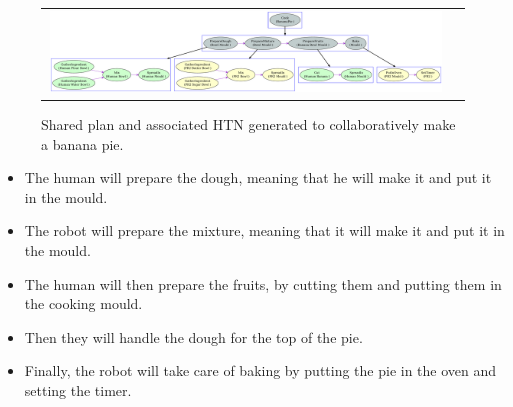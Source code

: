 \begin{figure}[ht!]
 \centering
 \begin{tabular}{cc}
  \includegraphics[width=0.99\textwidth]{img/plan_management/bananaPie.pdf}
 \end{tabular}
   \vspace{-8pt}
 \caption{Shared plan and associated HTN generated to collaboratively make a banana pie.}
 \label{fig:plan_management-bananaPlan}
   \vspace{-22pt}
 \end{figure}
 

\begin{itemize}
\item The human will prepare the dough, meaning that he will make it and put it in the mould.
\item The robot will prepare the mixture, meaning that it will make it and put it in the mould.
\item The human will then prepare the fruits, by cutting them and putting them in the cooking mould.
\item Then they will handle the dough for the top of the pie.
\item Finally, the robot will take care of baking by putting the pie in the oven and setting the timer.
\end{itemize} 


